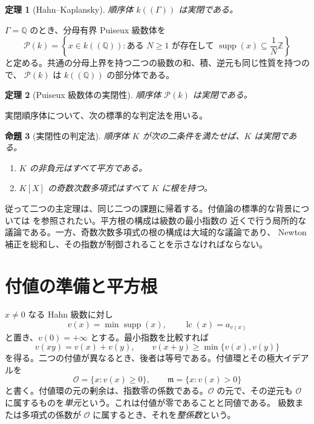 \documentclass[11pt,uplatex,dvipdfmx]{jsarticle}
\newcommand{\Puiseux}{\mathcal P(k)}
\newcommand{\Val}{v}
\newcommand{\Supp}{\operatorname{supp}}
\newcommand{\lc}{\operatorname{lc}}
\newcommand{\Ocal}{\mathcal O}
\theoremstyle{proofnote}
\newtheorem{theorem}{定理}[section]
\newtheorem{proposition}[theorem]{命題}
\begin{document}
\begin{theorem}[Hahn--Kaplansky]
\label{thm:hahn-real-closed}
  順序体 \(k((\Gamma))\) は実閉である。
\end{theorem}

\(\Gamma=\mathbb Q\) のとき、分母有界 Puiseux 級数体を
\[
  \Puiseux
  =
  \left\{
    x\in k((\mathbb Q)):
    \text{ある }N\ge1\text{ が存在して }
    \Supp(x)\subseteq\frac1N\mathbb Z
  \right\}
\]
と定める。共通の分母上界を持つ二つの級数の和、積、逆元も同じ性質を持つので、
\(\Puiseux\) は \(k((\mathbb Q))\) の部分体である。

\begin{theorem}[Puiseux 級数体の実閉性]
\label{thm:puiseux-real-closed}
  順序体 \(\Puiseux\) は実閉である。
\end{theorem}

実閉順序体について、次の標準的な判定法を用いる。
\begin{proposition}[実閉性の判定法]
\label{prop:real-closed-criterion}
  順序体 \(K\) が次の二条件を満たせば、\(K\) は実閉である。
  \begin{enumerate}[label=(\roman*)]
    \item \(K\) の非負元はすべて平方である。
    \item \(K[X]\) の奇数次数多項式はすべて \(K\) に根を持つ。
  \end{enumerate}
\end{proposition}

従って二つの主定理は、同じ二つの課題に帰着する。付値論の標準的な背景については
\cite{Kaplansky,EnglerPrestel} を参照されたい。平方根の構成は級数の最小指数の
近くで行う局所的な議論である。一方、奇数次数多項式の根の構成は大域的な議論であり、
Newton 補正を総和し、その指数が制御されることを示さなければならない。

\section{付値の準備と平方根}
\label{sec:square-roots}

\(x\ne0\) なる Hahn 級数に対し
\[
  \Val(x)=\min\Supp(x),\qquad
  \lc(x)=a_{\Val(x)}
\]
と置き、\(\Val(0)=+\infty\) とする。最小指数を比較すれば
\[
  \Val(xy)=\Val(x)+\Val(y),\qquad
  \Val(x+y)\ge\min\{\Val(x),\Val(y)\}
\]
を得る。二つの付値が異なるとき、後者は等号である。付値環とその極大イデアルを
\[
  \Ocal=\{x:\Val(x)\ge0\},\qquad
  \mathfrak m=\{x:\Val(x)>0\}
\]
と書く。付値環の元の剰余は、指数零の係数である。\(\Ocal\) の元で、その逆元も
\(\Ocal\) に属するものを\emph{単元}という。これは付値が零であることと同値である。
級数または多項式の係数が \(\Ocal\) に属するとき、それを\emph{整係数}という。
\end{document}
